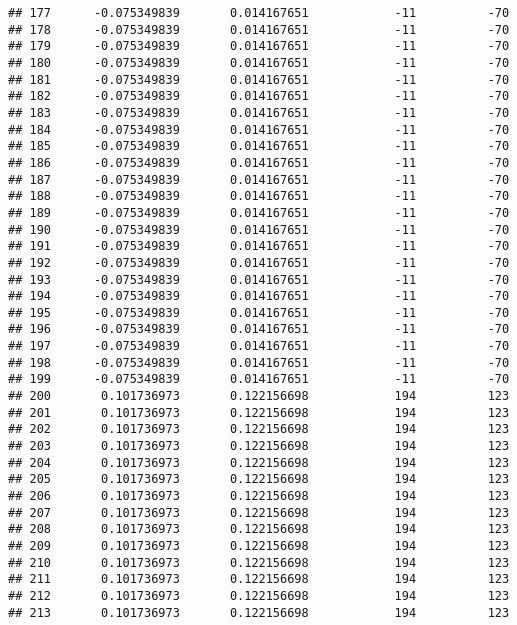 \documentclass[]{article}
\begin{document}
\begin{verbatim}
## 177      -0.075349839       0.014167651            -11          -70
## 178      -0.075349839       0.014167651            -11          -70
## 179      -0.075349839       0.014167651            -11          -70
## 180      -0.075349839       0.014167651            -11          -70
## 181      -0.075349839       0.014167651            -11          -70
## 182      -0.075349839       0.014167651            -11          -70
## 183      -0.075349839       0.014167651            -11          -70
## 184      -0.075349839       0.014167651            -11          -70
## 185      -0.075349839       0.014167651            -11          -70
## 186      -0.075349839       0.014167651            -11          -70
## 187      -0.075349839       0.014167651            -11          -70
## 188      -0.075349839       0.014167651            -11          -70
## 189      -0.075349839       0.014167651            -11          -70
## 190      -0.075349839       0.014167651            -11          -70
## 191      -0.075349839       0.014167651            -11          -70
## 192      -0.075349839       0.014167651            -11          -70
## 193      -0.075349839       0.014167651            -11          -70
## 194      -0.075349839       0.014167651            -11          -70
## 195      -0.075349839       0.014167651            -11          -70
## 196      -0.075349839       0.014167651            -11          -70
## 197      -0.075349839       0.014167651            -11          -70
## 198      -0.075349839       0.014167651            -11          -70
## 199      -0.075349839       0.014167651            -11          -70
## 200       0.101736973       0.122156698            194          123
## 201       0.101736973       0.122156698            194          123
## 202       0.101736973       0.122156698            194          123
## 203       0.101736973       0.122156698            194          123
## 204       0.101736973       0.122156698            194          123
## 205       0.101736973       0.122156698            194          123
## 206       0.101736973       0.122156698            194          123
## 207       0.101736973       0.122156698            194          123
## 208       0.101736973       0.122156698            194          123
## 209       0.101736973       0.122156698            194          123
## 210       0.101736973       0.122156698            194          123
## 211       0.101736973       0.122156698            194          123
## 212       0.101736973       0.122156698            194          123
## 213       0.101736973       0.122156698            194          123

\end{verbatim}
\end{document}
